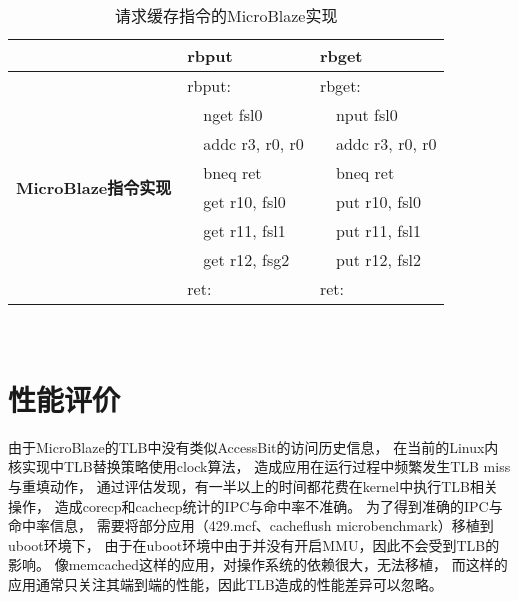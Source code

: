 \begin{table}[tb]
  \centering
  \begin{minipage}[t]{0.6\linewidth}
  \caption{请求缓存指令的MicroBlaze实现}
  \label{tab:pard-dp-isa-impl}
    \begin{tabular*}{\linewidth}{lp{0.5cm}lp{0.5cm}l}
      \toprule[1.5pt]
       & \multicolumn{2}{l}{\textbf{rbput}} & \multicolumn{2}{l}{\textbf{rbget}} \\ 
      \midrule[1pt]

      \multirow{8}{2cm}{\textbf{MicroBlaze指令实现}} & \multicolumn{2}{l}{rbput:}   & \multicolumn{2}{l}{rbget:} \\
                                                   &  & nget fsl0                 &  & nput fsl0               \\
                                                   &  & addc r3, r0, r0           &  & addc r3, r0, r0         \\
                                                   &  & bneq ret                  &  & bneq ret                \\
                                                   &  & get r10, fsl0             &  & put r10, fsl0           \\
                                                   &  & get r11, fsl1             &  & put r11, fsl1           \\
                                                   &  & get r12, fsg2             &  & put r12, fsl2           \\
                                                   & \multicolumn{2}{l}{ret:}     & \multicolumn{2}{l}{ret:}   \\
      \bottomrule[1.5pt]
    \end{tabular*}\\[2pt]
  \end{minipage}
\end{table}


\section{性能评价}

由于MicroBlaze的TLB中没有类似AccessBit的访问历史信息，
在当前的Linux内核实现中TLB替换策略使用clock算法，
造成应用在运行过程中频繁发生TLB miss与重填动作，
通过评估发现，有一半以上的时间都花费在kernel中执行TLB相关操作，
造成corecp和cachecp统计的IPC与命中率不准确。
为了得到准确的IPC与命中率信息，
需要将部分应用（429.mcf、cacheflush microbenchmark）移植到uboot环境下，
由于在uboot环境中由于并没有开启MMU，因此不会受到TLB的影响。
像memcached这样的应用，对操作系统的依赖很大，无法移植，
而这样的应用通常只关注其端到端的性能，因此TLB造成的性能差异可以忽略。


